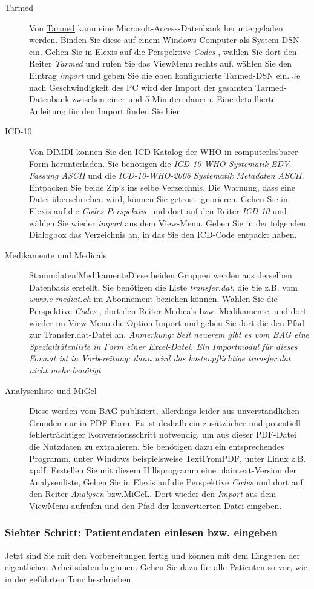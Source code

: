 \begin{description}
 \item[Tarmed] Von \href{www.tarmedsuisse.ch}{Tarmed} kann eine Microsoft-Access-Datenbank 
 heruntergeladen werden. Binden Sie diese auf einem Windows-Computer als System-DSN ein. Gehen Sie in Elexis auf die 
 Perspektive  \textit{Codes} , wählen Sie dort den Reiter  \textit{Tarmed}  und rufen Sie das ViewMenu rechts auf. 
 wählen Sie den Eintrag  \textit{import}  und geben Sie die eben konfigurierte Tarmed-DSN ein. Je nach Geschwindigkeit 
 des PC wird der Import der gesamten Tarmed-Datenbank zwischen einer und 5 Minuten dauern. Eine detaillierte Anleitung 
 für den Import finden Sie hier
 \item[ICD-10] Von 
 \href{http://www.dimdi.de/dynamic/de/klassi/downloadcenter/icd-10-who/version2006/systematik/}{DIMDI} können Sie den 
 ICD-Katalog der WHO in computerlesbarer Form herunterladen. Sie benötigen die \textit{ICD-10-WHO-Systematik 
 EDV-Fassung ASCII} und die \textit{ICD-10-WHO-2006 Systematik Metadaten ASCII}. Entpacken Sie beide Zip's ins selbe 
 Verzeichnis. Die Warnung, dass eine Datei überschrieben wird, können Sie getrost ignorieren. Gehen Sie in Elexis auf 
 die \textit{Codes-Perspektive} und dort auf den Reiter  \textit{ICD-10}  und wählen Sie wieder  \textit{import}  aus 
 dem View-Menu. Geben Sie in der folgenden Dialogbox das Verzeichnis an, in das Sie den ICD-Code entpackt haben.
 \item[Medikamente und Medicals] \indexname{Stammdaten!Medikamente}Diese beiden Gruppen werden aus derselben Datenbasis 
 erstellt. Sie benötigen die Liste \textit{transfer.dat}, die Sie z.B. vom \textit{www.e-mediat.ch} im Abonnement 
 beziehen können. Wählen Sie die Perspektive  \textit{Codes} , dort den Reiter Medicals bzw. Medikamente, und dort 
 wieder im View-Menu die Option Import und geben Sie dort die den Pfad zur Transfer.dat-Datei an.
\textit{Anmerkung: Seit neuerem gibt es vom BAG eine Spezialitätenliste in Form einer Excel-Datei. Ein Importmodul für dieses Format ist in Vorbereitung; dann wird das kostenpflichtige transfer.dat nicht mehr benötigt  }
 \item[Analysenliste und MiGel] Diese werden vom BAG publiziert, allerdings leider aus 
 unverständlichen Gründen nur in PDF-Form. Es ist deshalb ein zusätzlicher und potentiell fehlerträchtiger 
 Konversionsschritt notwendig, um aus dieser PDF-Datei die Nutzdaten zu extrahieren. Sie benötigen dazu ein 
 entsprechendes Programm, unter Windows beispielsweise TextFromPDF, unter Linux z.B. xpdf. Erstellen Sie mit diesem 
 Hilfsprogramm eine plaintext-Version der Analysenliste, Gehen Sie in Elexis auf die Perspektive \textit{Codes}  und 
 dort auf den Reiter \textit{Analysen} bzw.MiGeL. Dort wieder den \textit{Import} aus dem ViewMenu aufrufen und den 
 Pfad der konvertierten Datei eingeben.
 \end{description}

\subsubsection{Siebter Schritt: Patientendaten einlesen bzw. eingeben}
Jetzt sind Sie mit den Vorbereitungen fertig und können mit dem Eingeben der eigentlichen Arbeitsdaten beginnen. Gehen 
Sie dazu für alle Patienten so vor, wie in der geführten Tour beschrieben

